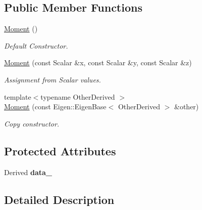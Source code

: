 \subsection*{Public Member Functions}
\begin{DoxyCompactItemize}
\item 
\hyperlink{classow__core_1_1Moment_ac0c0aa2da1fa194df0c4e32792f9bdb4}{Moment} ()\hypertarget{classow__core_1_1Moment_ac0c0aa2da1fa194df0c4e32792f9bdb4}{}\label{classow__core_1_1Moment_ac0c0aa2da1fa194df0c4e32792f9bdb4}

\begin{DoxyCompactList}\small\item\em Default Constructor. \end{DoxyCompactList}\item 
\hyperlink{classow__core_1_1Moment_a9c400630f5cd1bae41a68a4692138b96}{Moment} (const Scalar \&x, const Scalar \&y, const Scalar \&z)\hypertarget{classow__core_1_1Moment_a9c400630f5cd1bae41a68a4692138b96}{}\label{classow__core_1_1Moment_a9c400630f5cd1bae41a68a4692138b96}

\begin{DoxyCompactList}\small\item\em Assignment from Scalar values. \end{DoxyCompactList}\item 
{\footnotesize template$<$typename Other\+Derived $>$ }\\\hyperlink{classow__core_1_1Moment_a4e0a0f99a22ef5423718aae4db3b4935}{Moment} (const Eigen\+::\+Eigen\+Base$<$ Other\+Derived $>$ \&other)
\begin{DoxyCompactList}\small\item\em Copy constructor. \end{DoxyCompactList}\end{DoxyCompactItemize}
\subsection*{Protected Attributes}
\begin{DoxyCompactItemize}
\item 
Derived {\bfseries data\+\_\+}\hypertarget{classow__core_1_1Moment_afc9f0b1dc8468b83af5b84d96b039b9e}{}\label{classow__core_1_1Moment_afc9f0b1dc8468b83af5b84d96b039b9e}

\end{DoxyCompactItemize}


\subsection{Detailed Description}
